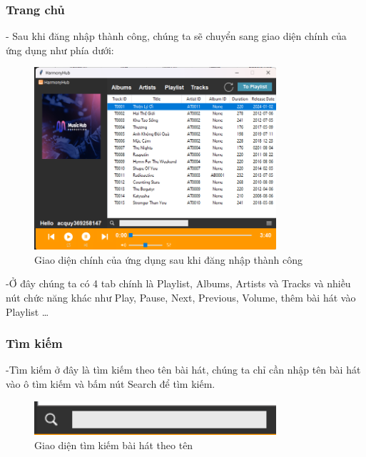 \documentclass[a4paper]{article}
\begin{document}
\begin{flushleft}
	\subsubsection{Trang chủ}
	- Sau khi đăng nhập thành công, chúng ta sẽ chuyển sang giao diện chính của ứng dụng như phía dưới:
	\begin{figure}[h]
		\centering
		\includegraphics[width=0.8\textwidth]{images/MainUI-User.png}
		\caption{Giao diện chính của ứng dụng sau khi đăng nhập thành công}
	\end{figure}

	-Ở đây chúng ta có 4 tab chính là Playlist, Albums, Artists và Tracks và nhiều nút chức năng khác như Play, Pause, Next, Previous, Volume, thêm bài hát vào Playlist \dots

	\subsubsection{Tìm kiếm}
	-Tìm kiếm ở đây là tìm kiếm theo tên bài hát, chúng ta chỉ cần nhập tên bài hát vào ô tìm kiếm và bấm nút Search để tìm kiếm.
	\begin{figure}[h]
		\centering
		\includegraphics[width=0.8\textwidth]{images/search.png}
		\caption{Giao diện tìm kiếm bài hát theo tên}
	\end{figure}
\end{flushleft}
\clearpage
\newpage
\end{document}

